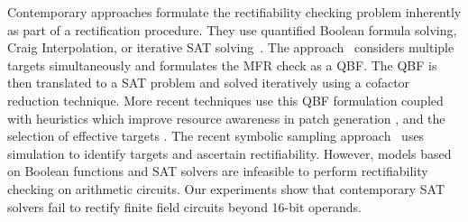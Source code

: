 \par 
Contemporary approaches formulate the rectifiability 
checking problem inherently as part of a rectification procedure. 
They use quantified Boolean formula solving,
Craig Interpolation, or iterative SAT
solving~\cite{MF_Huang:DATE12,SS_Fujita:ISCAS19,SS_Alan:DAC18}.  
The approach~\cite{MF_Huang:DATE12} considers multiple targets simultaneously and 
formulates the MFR check as a QBF. 
The QBF is then translated to a SAT problem and solved iteratively using a cofactor reduction technique.
More recent techniques use this QBF formulation coupled with heuristics which improve
resource awareness in patch generation \cite{SS_Alan:DAC18}, and the selection of effective targets \cite{SS_Fujita:ISCAS19}. 
The recent symbolic sampling approach~\cite{SS_Roland:DAC19} uses simulation to 
identify targets and ascertain rectifiability.
However, models based on Boolean functions and SAT solvers are infeasible to perform rectifiability checking 
on arithmetic circuits. Our experiments show that contemporary SAT solvers fail to rectify finite field circuits beyond 16-bit operands.





